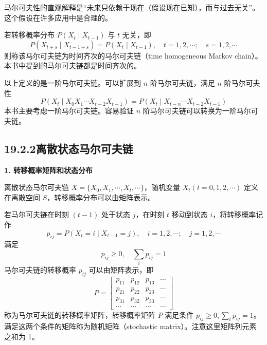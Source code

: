\documentclass[UTF8,12pt,a4paper,fontset=fandol]{ctexart}
\begin{document}
马尔可夫性的直观解释是“未来只依赖于现在（假设现在已知），而与过去无关”。这个假设在许多应用中是合理的。

若转移概率分布 $P(X_t\mid X_{t-1})$ 与 $t$ 无关，即
\begin{equation}
P(X_{t+s}\mid X_{t-1+s})=P(X_t\mid X_{t-1}),\quad t=1,2,\cdots;\quad s=1,2,\cdots
\tag{19.7}
\end{equation}
则称该马尔可夫链为时间齐次的马尔可夫链（time homogeneous Markov chain）。本书中提到的马尔可夫链都是时间齐次的。

以上定义的是一阶马尔可夫链。可以扩展到 $n$ 阶马尔可夫链，满足 $n$ 阶马尔可夫性
\begin{equation}
P(X_t\mid X_0X_1\cdots X_{t-2}X_{t-1})=P(X_t\mid X_{t-n}\cdots X_{t-2}X_{t-1})
\tag{19.8}
\end{equation}
本书主要考虑一阶马尔可夫链。容易验证 $n$ 阶马尔可夫链可以转换为一阶马尔可夫链。

\subsection*{19.2.2\quad 离散状态马尔可夫链}

\noindent\textbf{1. 转移概率矩阵和状态分布}

离散状态马尔可夫链 $X=\{X_0,X_1,\cdots,X_t,\cdots\}$，随机变量 $X_t(t=0,1,2,\cdots)$ 定义在离散空间 $S$，转移概率分布可以由矩阵表示。

若马尔可夫链在时刻 $(t-1)$ 处于状态 $j$，在时刻 $t$ 移动到状态 $i$，将转移概率记作
\begin{equation}
p_{ij}=P(X_t=i\mid X_{t-1}=j),\quad i=1,2,\cdots;\quad j=1,2,\cdots
\tag{19.9}
\end{equation}
满足
\[
p_{ij}\geqslant 0,\quad \sum_i p_{ij}=1
\]
马尔可夫链的转移概率 $p_{ij}$ 可以由矩阵表示，即
\begin{equation}
P=
\begin{bmatrix}
p_{11} & p_{12} & p_{13} & \cdots\\
p_{21} & p_{22} & p_{23} & \cdots\\
p_{31} & p_{32} & p_{33} & \cdots\\
\cdots & \cdots & \cdots & \cdots
\end{bmatrix}
\tag{19.10}
\end{equation}
称为马尔可夫链的转移概率矩阵，转移概率矩阵 $P$ 满足条件 $p_{ij}\geqslant 0,\sum_i p_{ij}=1$。满足这两个条件的矩阵称为随机矩阵（stochastic matrix）。注意这里矩阵列元素之和为 1。
\end{document}
